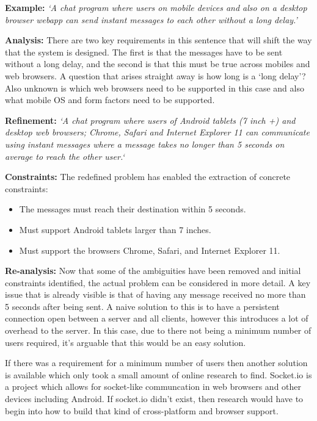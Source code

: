 \documentclass[11pt,english,numbers=endperiod,parskip=half]{scrartcl}
\begin{document}
    \textbf{Example:}
    \textit{`A chat program where users on mobile devices and also on a desktop
    browser webapp can send instant messages to each other without a long delay.'}

    \textbf{Analysis:}
    There are two key requirements in this sentence that will shift the way that
    the system is designed. The first is that the messages have to be sent without
    a long delay, and the second is that this must be true across mobiles and
    web browsers. A question that arises straight away is how long is a `long
    delay'? Also unknown is which web browsers need to be supported in this case
    and also what mobile OS and form factors need to be supported.

    \textbf{Refinement:}
    \textit{`A chat program where users of Android tablets (7 inch +) and desktop web
    browsers; Chrome, Safari and Internet Explorer 11 can communicate using
    instant messages where a message takes no longer than 5 seconds on average
    to reach the other user.`}

    \textbf{Constraints:}
    The redefined problem has enabled the extraction of concrete constraints:
    \begin{itemize}
      \item{
        The messages must reach their destination within 5 seconds.
      }
      \item{
        Must support Android tablets larger than 7 inches.
      }
      \item{
        Must support the browsers Chrome, Safari, and Internet Explorer 11.
      }
    \end{itemize}

    \textbf{Re-analysis:}
    Now that some of the ambiguities have been removed and initial constraints
    identified, the actual problem can be considered in more detail. A key issue
    that is already visible is that of having any message received no more than
    5 seconds after being sent. A naive solution to this is to have a persistent
    connection open between a server and all clients, however this introduces
    a lot of overhead to the server. In this case, due to there not being a
    minimum number of users required, it's arguable that this would be an easy
    solution.

    If there was a requirement for a minimum number of users then another
    solution is available which only took a small amount of online research to
    find. Socket.io is a project which allows for socket-like communcation in
    web browsers and other devices including Android. If socket.io didn't
    exist, then research would have to begin into how to build that kind of
    cross-platform and browser support.
\end{document}
